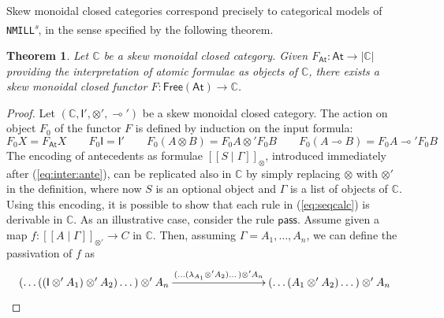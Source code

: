 \documentclass[submission,copyright,creativecommons]{eptcs}
\newtheorem{theorem}{Theorem}[section]
\theoremstyle{definition}
\newcommand{\ldbc}{[\![}
\newcommand{\rdbc}{]\!]}
\newcommand{\pass}{\mathsf{pass}}
\newcommand{\ot}{\otimes}
\newcommand{\lolli}{\multimap}
\newcommand{\I}{\mathsf{I}}
\newcommand{\NMILL}{\texttt{NMILL}}
\newcommand{\SkNMILL}{\NMILL\textsuperscript{\textit{s}}}
\newcommand{\FSkMCC}{\mathsf{Free}}
\begin{document}
Skew monoidal closed categories correspond precisely to categorical models of \SkNMILL, in the sense specified by the following theorem.
\begin{theorem}\label{thm:models}
  Let $\mathbb{C}$ be a skew monoidal closed category. Given $F_{\mathsf{At}} : \mathsf{At} \rightarrow |\mathbb{C}|$ providing the interpretation of atomic formulae as objects of $\mathbb{C}$, there exists a skew monoidal closed functor $F : \FSkMCC(\mathsf{At}) \rightarrow \mathbb{C}$.
\end{theorem}
\begin{proof}
  Let $(\mathbb{C} , \I' , \ot' , \lolli')$ be a skew monoidal closed category.
  The action on object $F_0$ of the functor $F$ is defined by induction on the input formula:
  \begin{equation*}
    F_0X = F_{\mathsf{At}}X
    \qquad
    F_0\I = \I'
    \qquad
    F_0(A \ot B) = F_0A \ot' F_0B
    \qquad
    F_0(A \lolli B) = F_0A \lolli' F_0B
  \end{equation*}
  The encoding of antecedents as formulae $\ldbc S \mid \Gamma \rdbc_{\ot}$, introduced immediately after (\ref{eq:inter:ante}), can be replicated also in $\mathbb{C}$ by simply replacing $\ot$ with $\ot'$ in the definition, where now $S$ is an optional object and $\Gamma$ is a list of objects of $\mathbb{C}$. Using this encoding, it is possible to show that each rule in (\ref{eq:seqcalc}) is derivable in $\mathbb{C}$. As an illustrative case, consider the rule $\pass$. Assume given a map $f : \ldbc A \mid \Gamma \rdbc_{\ot'} \to C$ in $\mathbb{C}$. Then, assuming $\Gamma = A_1,\dots,A_n$, we can define the passivation of $f$ as
\[\xymatrixcolsep{7pc}
\xymatrix{
  (\dots ((\I \ot' A_1) \ot' A_2) \dots ) \ot' A_n
  \ar[r]^-{(\dots (\lambda_{A_1} \ot' A_2) \dots ) \ot' A_n} &
  (\dots (A_1 \ot' A_2) \dots ) \ot' A_n
}\]
\end{proof}
\end{document}

